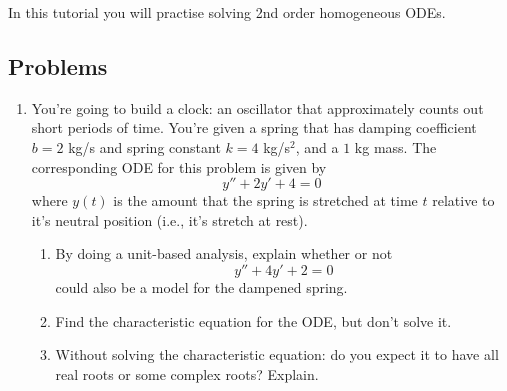 \begin{objectives}
	In this tutorial you will practise solving 2nd order homogeneous ODEs.
\end{objectives}

\vspace{-.5em}
\subsection*{Problems}
\vspace{-.5em}






\begin{enumerate}


    \item You're going to build a clock: an oscillator that approximately counts out short periods of time.
    You're given a spring that has damping coefficient $b=2$ kg/s and spring constant $k=4$ kg/s$^2$, and a $1$ kg mass. The corresponding ODE for this problem is given by
    \[
        y'' + 2y' + 4 = 0
    \]
    where $y(t)$ is the amount that the spring is stretched  at time $t$ relative to it's neutral position (i.e., it's stretch at rest).

    \begin{enumerate}
        \item By doing a unit-based analysis, explain whether or not 
        \[
            y'' + 4y' + 2 = 0
        \]
        could also be a model for the dampened spring.

        \item Find the characteristic equation for the ODE, but don't solve it.

        \item Without solving the characteristic equation: do you expect it to have all real roots or some complex roots? Explain.


\end{enumerate}
\end{enumerate}
